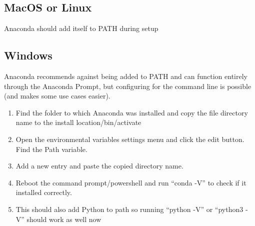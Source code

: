 \documentclass[12pt]{article}
\begin{document}
            \subsection{MacOS or Linux}
                Anaconda should add itself to PATH during setup
            \subsection{Windows}
                Anaconda recommends against being added to PATH and can function entirely through the Anaconda Prompt,
                but configuring for the command line is possible (and makes some use cases easier).
                
                \begin{enumerate}
                    \item Find the folder to which Anaconda was installed and copy the file directory name to the \textlangle install location\textrangle /bin/activate
                    \item Open the environmental variables settings menu and click the edit button. Find the Path variable.
                    \item Add a new entry and paste the copied directory name.
                    \item Reboot the command prompt/powershell and run “conda -V” to check if it installed correctly.
                    \item This should also add Python to path so running “python -V” or “python3 -V” should work as well now
                \end{enumerate}
\end{document}
